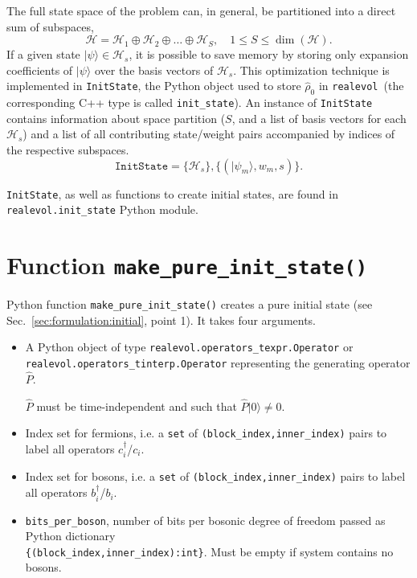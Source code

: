 \documentclass[]{article}
\newcommand{\realevol}{\texttt{realevol}}
\newcommand{\ket}[1]{\ensuremath{|#1\rangle}}
\begin{document}
The full state space of the problem can, in general, be partitioned into a direct sum of subspaces,
\begin{equation}
    \mathcal{H} = \mathcal{H}_1 \oplus \mathcal{H}_2 \oplus \ldots \oplus
                  \mathcal{H}_S,\quad 1\le S\le \dim(\mathcal{H}).
\end{equation}
If a given state $\ket{\psi}\in\mathcal{H}_s$, it is possible to save memory by storing only expansion coefficients of $\ket{\psi}$ over the basis vectors of
$\mathcal{H}_s$. This optimization technique is implemented in \texttt{InitState}, the Python object used to store $\hat\rho_0$ in \realevol\
(the corresponding C++ type is called \texttt{init\_state}). An instance of
\texttt{InitState} contains information about space partition ($S$, and a list of basis vectors for each $\mathcal{H}_s$) and a list of all contributing state/weight pairs accompanied by indices of the respective subspaces.
\begin{equation}
    \mathtt{InitState} = \{\mathcal{H}_s\}, \{(\ket{\psi_m}, w_m, s)\}.
\end{equation}

\texttt{InitState}, as well as functions to create initial states, are found in \texttt{realevol.init\_state} Python module.

\section{\label{sec:make_pure_init_state}Function \texttt{make\_pure\_init\_state()}}

Python function \texttt{make\_pure\_init\_state()} creates a pure initial state (see Sec.~\ref{sec:formulation:initial}, point 1). It takes four arguments.
\begin{itemize}
    \item A Python object of type \texttt{realevol.operators\_texpr.Operator} or
    \texttt{realevol.operators\_tinterp.Operator}
    representing the generating operator $\hat P$.

    $\hat P$ must be time-independent and such that $\hat P\ket{0} \neq 0$.
    \item Index set for fermions, i.e. a \texttt{set} of \texttt{(block\_index,inner\_index)} pairs to label all operators $c^\dagger_i$/$c_i$.

    \item Index set for bosons, i.e. a \texttt{set} of \texttt{(block\_index,inner\_index)} pairs to label all operators $b^\dagger_i$/$b_i$.

    \item \texttt{bits\_per\_boson}, number of bits per bosonic
    degree of freedom passed as Python dictionary\\
    \texttt{\{(block\_index,inner\_index):int\}}. Must be empty if
    system contains no bosons.

\end{itemize}
\end{document}
